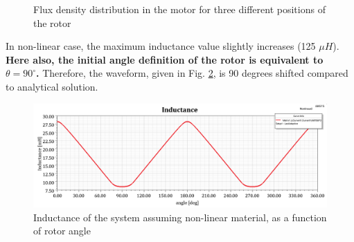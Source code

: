 \documentclass{reportClass}
\begin{document}
\begin{figure}[h!]
    \centering
       \hspace{0.5cm}
         \hspace{0.5cm}
  \caption{Flux density distribution in the motor for three different positions of the rotor}
  \label{fig:bvec_nonlin} 
\end{figure}

In non-linear case, the maximum inductance value slightly increases (125 $\mu H$). \textbf{Here also, the initial angle definition of the rotor is equivalent to $\theta = 90^\circ$.} Therefore, the waveform, given in Fig. \ref{fig:ind_nonlin}, is 90 degrees shifted compared to analytical solution.\\

\begin{figure}[h!]
    \centering
\includegraphics[width=0.75\linewidth]{ind_nonlin_wrtangle.png}
\caption{Inductance of the system assuming non-linear material, as a function of rotor angle}
  \label{fig:ind_nonlin} 
\end{figure}
\end{document}
